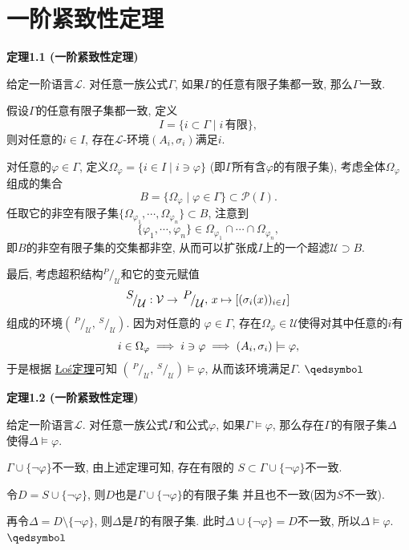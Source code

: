 \documentclass[UTF8]{ctexart}
\begin{document}
\setlength{\abovedisplayskip}{1pt}
\setlength{\belowdisplayskip}{1pt}

\section{一阶紧致性定理}

\hypertarget{sec:定理1.1}{}
\noindent\textbf{定理1.1 (一阶紧致性定理)}

给定一阶语言$\mathcal{L}$. 对任意一族公式$\Gamma$,
如果$\Gamma$的任意有限子集都一致, 那么$\Gamma$一致.


假设$\Gamma$的任意有限子集都一致, 定义
\[
    I=\{i\subset\Gamma\mid i\,\text{有限}\},
\]
则对任意的$i\in I$, 存在$\mathcal{L}$-环境$(A_i,\sigma_i)$满足$i$.

对任意的$\varphi\in\Gamma$, 定义$\Omega_\varphi=\{i\in I\mid i\ni\varphi\}$
(即$\Gamma$所有含$\varphi$的有限子集), 考虑全体$\Omega_\varphi$组成的集合
\[
    B=\{\Omega_\varphi\mid\varphi\in\Gamma\}\subset\mathcal{P}(I).
\]
任取它的非空有限子集$\{\Omega_{\varphi_1},\cdots,\Omega_{\varphi_n}\}\subset B$,
注意到
\[
    \{\varphi_1,\cdots,\varphi_n\}\in
    \Omega_{\varphi_1}\cap\cdots\cap\Omega_{\varphi_n},
\]
即$B$的非空有限子集的交集都非空, 从而可以扩张成$I$上的一个超滤$\mathcal{U}\supset B$.

\vspace{3pt}
最后, 考虑超积结构$^{\displaystyle P}\!/_{\displaystyle\mathcal{U}}$和它的变元赋值
\[
    ^{\displaystyle S}\!/_{\displaystyle\mathcal{U}}:
    \mathcal{V}\to\,^{\displaystyle P}\!/_{\displaystyle\mathcal{U}},\,
    x\mapsto[(\sigma_i(x))_{i\in I}]\\[3pt]
\]
组成的环境$\left(\,^{\displaystyle P}\!/_{\displaystyle\mathcal{U}},\,
^{\displaystyle S}\!/_{\displaystyle\mathcal{U}}\right)$. 因为对任意的
$\varphi\in\Gamma$, 存在$\Omega_\varphi\in\mathcal{U}$使得对其中任意的$i$有
\[
    i\in\Omega_\varphi\implies i\ni\varphi\implies
    (A_i,\sigma_i)\models\varphi,\\[3pt]
\]
于是根据 \href{02 Łoś 定理#nameddest=sec:定理1.1}{Łoś定理}可知
$\left(\,^{\displaystyle P}\!/_{\displaystyle\mathcal{U}},\,^{\displaystyle S}
\!/_{\displaystyle\mathcal{U}}\right)\models\varphi$,
从而该环境满足$\Gamma$. \hfill $\qedsymbol$

\vspace{20pt}

\hypertarget{sec:定理1.2}{}
\noindent\textbf{定理1.2 (一阶紧致性定理)}

给定一阶语言$\mathcal{L}$. 对任意一族公式$\Gamma$和公式$\varphi$,
如果$\Gamma\models\varphi$, 那么存在$\Gamma$的有限子集$\Delta$
使得$\Delta\models\varphi$.


$\Gamma\cup\{\neg\varphi\}$不一致, 由上述定理可知, 存在有限的
$S\subset\Gamma\cup\{\neg\varphi\}$不一致.

令$D=S\cup\{\neg\varphi\}$, 则$D$也是$\Gamma\cup\{\neg\varphi\}$的有限子集
并且也不一致(因为$S$不一致).

再令$\Delta=D\setminus\{\neg\varphi\}$, 则$\Delta$是$\Gamma$的有限子集.
此时$\Delta\cup\{\neg\varphi\}=D$不一致, 所以$\Delta\models\varphi$.
\hfill $\qedsymbol$
\end{document}
